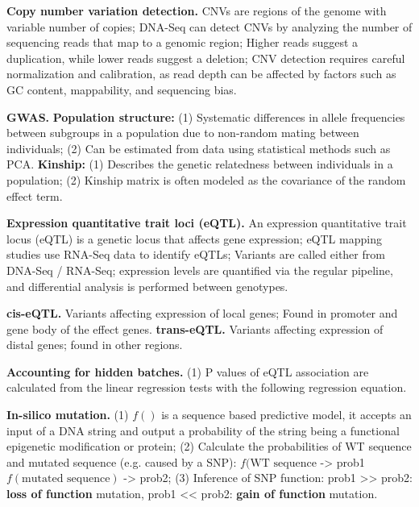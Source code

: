 \vspace{0.1em}\noindent
\textbf{Copy number variation detection.} CNVs are regions of the genome with variable number of copies; DNA-Seq can detect CNVs by analyzing the number of sequencing reads that map to a genomic region; Higher reads suggest a duplication, while lower reads suggest a deletion; CNV detection requires careful normalization and calibration, as read depth can be affected by factors such as GC content, mappability, and sequencing bias.

\vspace{0.1em}\noindent
\textbf{GWAS.} \textbf{Population structure:} (1) Systematic differences in allele frequencies between subgroups in a population due to non-random mating between individuals; (2) Can be estimated from data using statistical methods such as PCA. \textbf{Kinship: } (1) Describes the genetic relatedness between individuals in a population; (2) Kinship matrix is often modeled as the covariance of the random effect term.

\vspace{0.1em}\noindent
\textbf{Expression quantitative trait loci (eQTL).} An expression quantitative trait locus (eQTL) is a genetic locus that affects gene expression; eQTL mapping studies use RNA-Seq data to identify eQTLs; Variants are called either from DNA-Seq / RNA-Seq; expression levels are quantified via the regular pipeline, and differential analysis is performed between genotypes.

\vspace{0.1em}\noindent
\textbf{cis-eQTL.} Variants affecting expression of local genes; Found in promoter and gene body of the effect genes. \textbf{trans-eQTL.} Variants affecting expression of distal genes; found in other regions.

\vspace{0.1em}\noindent
\textbf{Accounting for hidden batches.} (1) P values of eQTL association are calculated from the linear regression tests with the following regression equation.

\vspace{0.1em}\noindent
\textbf{In-silico mutation.} (1) $f()$ is a sequence based predictive model, it accepts an input of a DNA string and output a probability of the string being a functional epigenetic modification or protein; (2) Calculate the probabilities of WT sequence and mutated sequence (e.g. caused by a SNP): $f(\text{WT sequence}$ -> prob1 $f(\text{mutated sequence})$ -> prob2; (3) Inference of SNP function: prob1 >> prob2: \textbf{loss of function} mutation, prob1 << prob2: \textbf{gain of function} mutation.

